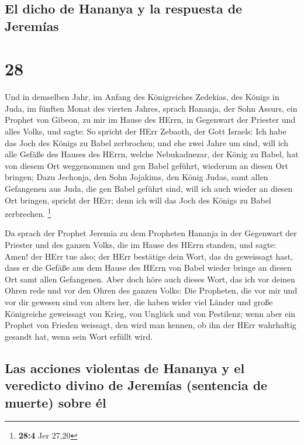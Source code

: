 \hypertarget{el-dicho-de-hananya-y-la-respuesta-de-jeremuxedas}{%
\subsection{El dicho de Hananya y la respuesta de
Jeremías}\label{el-dicho-de-hananya-y-la-respuesta-de-jeremuxedas}}

\hypertarget{section-27}{%
\section{28}\label{section-27}}

 Und in demselben Jahr, im Anfang des Königreiches
Zedekias, des Königs in Juda, im fünften Monat des vierten Jahres,
sprach Hananja, der Sohn Assurs, ein Prophet von Gibeon, zu mir im Hause
des HErrn, in Gegenwart der Priester und alles Volks, und sagte:
 So spricht der HErr Zebaoth, der Gott Israels: Ich habe
das Joch des Königs zu Babel zerbrochen;  und ehe zwei
Jahre um sind, will ich alle Gefäße des Hauses des HErrn, welche
Nebukadnezar, der König zu Babel, hat von diesem Ort weggenommen und gen
Babel geführt, wiederum an diesen Ort bringen;  Dazu
Jechonja, den Sohn Jojakims, den König Judas, samt allen Gefangenen aus
Juda, die gen Babel geführt sind, will ich auch wieder an diesen Ort
bringen, spricht der HErr; denn ich will das Joch des Königs zu Babel
zerbrechen. \footnote{\textbf{28:4} Jer 27,20}

 Da sprach der Prophet Jeremia zu dem Propheten Hananja in
der Gegenwart der Priester und des ganzen Volks, die im Hause des HErrn
standen,  und sagte: Amen! der HErr tue also; der HErr
bestätige dein Wort, das du geweissagt hast, dass er die Gefäße aus dem
Hause des HErrn von Babel wieder bringe an diesen Ort samt allen
Gefangenen.  Aber doch höre auch dieses Wort, das ich vor
deinen Ohren rede und vor den Ohren des ganzen Volks:  Die
Propheten, die vor mir und vor dir gewesen sind von alters her, die
haben wider viel Länder und große Königreiche geweissagt von Krieg, von
Unglück und von Pestilenz;  wenn aber ein Prophet von
Frieden weissagt, den wird man kennen, ob ihn der HErr wahrhaftig
gesandt hat, wenn sein Wort erfüllt wird.

\hypertarget{las-acciones-violentas-de-hananya-y-el-veredicto-divino-de-jeremuxedas-sentencia-de-muerte-sobre-uxe9l}{%
\subsection{Las acciones violentas de Hananya y el veredicto divino de
Jeremías (sentencia de muerte) sobre
él}\label{las-acciones-violentas-de-hananya-y-el-veredicto-divino-de-jeremuxedas-sentencia-de-muerte-sobre-uxe9l}}

